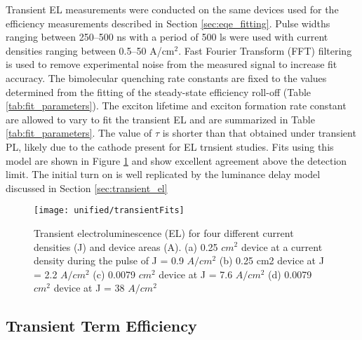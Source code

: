 \documentclass[../thesis.tex]{subfiles}
\begin{document}
Transient EL measurements were conducted on the same devices used for the efficiency measurements described in Section \ref{sec:eqe_fitting}. 
Pulse widths ranging between 250–500 ns with a period of 500 ls were used with current densities ranging between 0.5–50 A/cm$^2$. 
Fast Fourier Transform (FFT) filtering is used to remove experimental noise from the measured signal to increase fit accuracy. 
The bimolecular quenching rate constants are fixed to the values determined from the fitting of the steady-state efficiency roll-off (Table \ref{tab:fit_parameters}).
The exciton lifetime and exciton formation rate constant are allowed to vary to fit the transient EL and are summarized in Table \ref{tab:fit_parameters}.
The value of $\tau$ is shorter than that obtained under transient PL, likely due to the cathode present for EL trnsient studies.\supercite{Song2011}
Fits using this model are shown in Figure \ref{fig:transientFits} and show excellent agreement above the detection limit.  The initial turn on is well replicated by the luminance delay model discussed in Section \ref{sec:transient_el}


\begin{figure}[ht]
\centering
\texttt{[image: unified/transientFits]}
\caption{Transient electroluminescence (EL) for four different current densities (J) and device areas (A). (a) 0.25 $cm^2$ device at a current density during the pulse of J = 0.9 $A/cm^2$ (b) 0.25 cm2
device at J = 2.2 $A/cm^2$ (c) 0.0079 $cm^2$ device at J = 7.6 $A/cm^2$ (d) 0.0079 $cm^2$ device at J = 38 $A/cm^2$}
\label{fig:transientFits}
\end{figure}


\subsection{Transient Term Efficiency}
\end{document}
